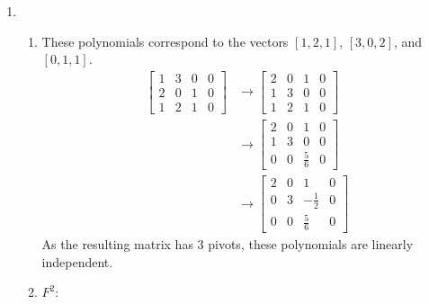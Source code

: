 \documentclass[12pt]{article}
\begin{document}
\begin{enumerate}
      \item \begin{enumerate}
                  \item These polynomials correspond to the vectors $[1,2,1]$, $[3,0,2]$, and $[0,1,1]$.
                        \begin{align*}
                              \begin{bmatrix}
                                    1 & 3 & 0 & 0 \\
                                    2 & 0 & 1 & 0 \\
                                    1 & 2 & 1 & 0
                              \end{bmatrix}
                               & \rightarrow \begin{bmatrix}
                                                   2 & 0 & 1 & 0 \\
                                                   1 & 3 & 0 & 0 \\
                                                   1 & 2 & 1 & 0
                                             \end{bmatrix}           \\
                               & \rightarrow \begin{bmatrix}
                                                   2 & 0 & 1           & 0 \\
                                                   1 & 3 & 0           & 0 \\
                                                   0 & 0 & \frac{5}{6} & 0
                                             \end{bmatrix}  \\
                               & \rightarrow \begin{bmatrix}
                                                   2 & 0 & 1            & 0 \\
                                                   0 & 3 & -\frac{1}{2} & 0 \\
                                                   0 & 0 & \frac{5}{6}  & 0
                                             \end{bmatrix}
                        \end{align*}
                        As the resulting matrix has $3$ pivots, these polynomials are linearly independent.
                  \item $F^2$:

\end{enumerate}
\end{enumerate}
\end{document}
